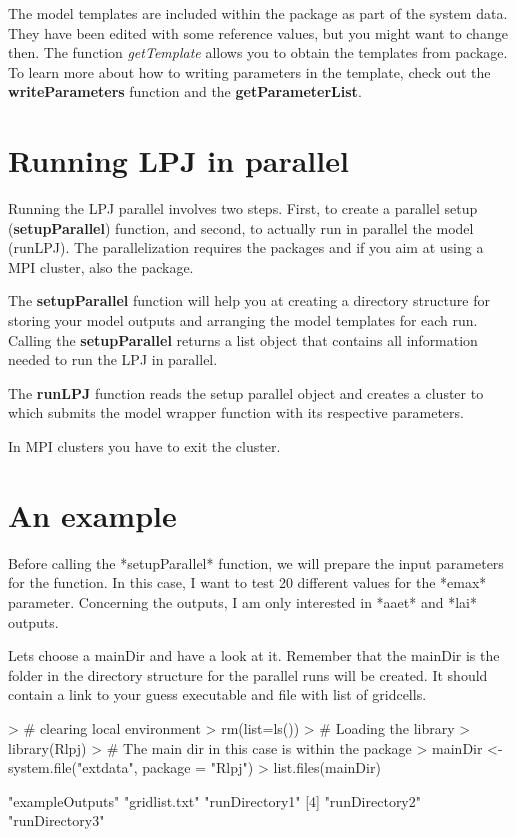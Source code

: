 \documentclass{article}
\begin{document}
The model templates are included within the package as part of the system data. They have been edited with some reference values, but you might want to change then. The function \emph{getTemplate} allows you to obtain the templates from package. To learn more about how to writing parameters in the template, check out the {\bf writeParameters}  function and the {\bf getParameterList}.



\section{Running LPJ in parallel}


Running the LPJ parallel involves two steps. First, to create a parallel setup ({\bf setupParallel}) function, and second, to actually run in parallel the model (runLPJ).  The parallelization requires the packages \verb@snow@ and if you aim at using a MPI cluster, also the \verb@Rmpi@  package.

The {\bf setupParallel} function will help you at creating a directory structure for storing your model outputs and arranging the model templates for each run. Calling the {\bf setupParallel}  returns a list object that contains all information needed to run the LPJ in parallel.

The {\bf runLPJ} function reads the setup parallel object and creates a cluster to which submits the model wrapper function with its respective parameters.

In MPI clusters you have to exit the cluster.


\section{An example}


Before calling the *setupParallel* function, we will prepare the input parameters for the function.  In this case, I want to test 20 different values for the *emax* parameter. Concerning the outputs, I am only interested in *aaet* and *lai* outputs.


Lets choose a mainDir and have a look at it. Remember that the mainDir is the folder in the directory structure for the parallel runs will be created. It should contain a link to your guess executable and file with list of gridcells.

\begin{Schunk}
\begin{Sinput}
> # clearing local environment
> rm(list=ls())
> # Loading the library
> library(Rlpj)
> # The main dir in this case is within the package
> mainDir <- system.file("extdata", package = "Rlpj")
> list.files(mainDir)
\end{Sinput}
\begin{Soutput}
[1] "exampleOutputs" "gridlist.txt"   "runDirectory1" 
[4] "runDirectory2"  "runDirectory3" 
\end{Soutput}
\end{Schunk}
\end{document}
